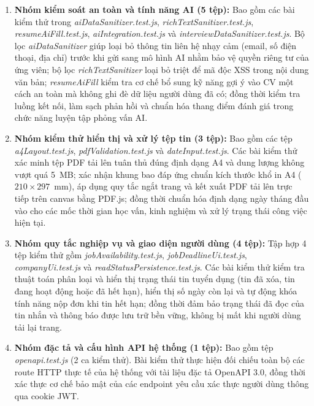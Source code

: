\begin{enumerate}
    \item \textbf{Nhóm kiểm soát an toàn và tính năng AI (5 tệp):}
    Bao gồm các bài kiểm thử trong \textit{aiDataSanitizer.test.js}, \textit{richTextSanitizer.test.js}, \textit{resumeAiFill.test.js}, \textit{aiIntegration.test.js} và \textit{interviewDataSanitizer.test.js}. Bộ lọc \textit{aiDataSanitizer} giúp loại bỏ thông tin liên hệ nhạy cảm (email, số điện thoại, địa chỉ) trước khi gửi sang mô hình AI nhằm bảo vệ quyền riêng tư của ứng viên; bộ lọc \textit{richTextSanitizer} loại bỏ triệt để mã độc XSS trong nội dung văn bản; \textit{resumeAiFill} kiểm tra cơ chế bổ sung kỹ năng gợi ý vào CV một cách an toàn mà không ghi đè dữ liệu người dùng đã có; đồng thời kiểm tra luồng kết nối, làm sạch phản hồi và chuẩn hóa thang điểm đánh giá trong chức năng luyện tập phỏng vấn AI.
    
    \item \textbf{Nhóm kiểm thử hiển thị và xử lý tệp tin (3 tệp):}
    Bao gồm các tệp \textit{a4Layout.test.js}, \textit{pdfValidation.test.js} và \textit{dateInput.test.js}. Các bài kiểm thử xác minh tệp PDF tải lên tuân thủ đúng định dạng A4 và dung lượng không vượt quá 5~MB; xác nhận khung bao đáp ứng chuẩn kích thước khổ in A4 ($210 \times 297$~mm), áp dụng quy tắc ngắt trang và kết xuất PDF tải lên trực tiếp trên canvas bằng PDF.js; đồng thời chuẩn hóa định dạng ngày tháng đầu vào cho các mốc thời gian học vấn, kinh nghiệm và xử lý trạng thái công việc hiện tại.

    \item \textbf{Nhóm quy tắc nghiệp vụ và giao diện người dùng (4 tệp):}
    Tập hợp 4 tệp kiểm thử gồm \textit{jobAvailability.test.js}, \textit{jobDeadlineUi.test.js}, \textit{companyUi.test.js} và \textit{readStatusPersistence.test.js}. Các bài kiểm thử kiểm tra thuật toán phân loại và hiển thị trạng thái tin tuyển dụng (tin đã xóa, tin đang hoạt động hoặc đã hết hạn), hiển thị số ngày còn lại và tự động khóa tính năng nộp đơn khi tin hết hạn; đồng thời đảm bảo trạng thái đã đọc của tin nhắn và thông báo được lưu trữ bền vững, không bị mất khi người dùng tải lại trang.

    \item \textbf{Nhóm đặc tả và cấu hình API hệ thống (1 tệp):}
    Bao gồm tệp \textit{openapi.test.js} (2 ca kiểm thử). Bài kiểm thử thực hiện đối chiếu toàn bộ các route HTTP thực tế của hệ thống với tài liệu đặc tả OpenAPI 3.0, đồng thời xác thực cơ chế bảo mật của các endpoint yêu cầu xác thực người dùng thông qua cookie JWT.
\end{enumerate}

